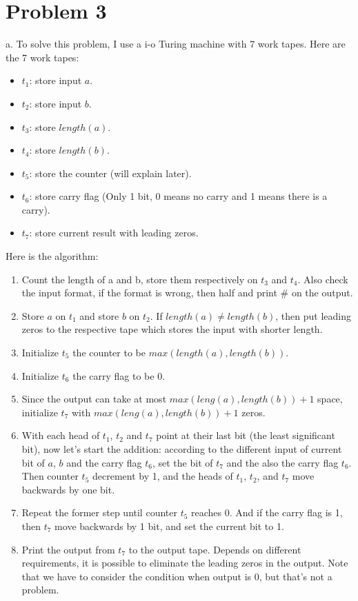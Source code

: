 \documentclass[12pt]{article}
\begin{document}
\section*{Problem 3}

a. To solve this problem, I use a i-o Turing machine with 7 work
tapes. Here are the 7 work tapes:

\begin{itemize}
\item $t_1$: store input $a$.
\item $t_2$: store input $b$.
\item $t_3$: store $length(a)$.
\item $t_4$: store $length(b)$.
\item $t_5$: store the counter (will explain later).
\item $t_6$: store carry flag (Only 1 bit, 0 means no carry and 1
  means there is a carry).
\item $t_7$: store current result with leading zeros.
\end{itemize}

Here is the algorithm:

\begin{enumerate}
\item Count the length of a and b, store them respectively on $t_3$ and
  $t_4$. Also check the input format, if the format is wrong, then half
  and print \# on the output. 
\item Store $a$ on $t_1$ and store $b$ on $t_2$. If $length(a) \neq
  length(b)$, then put leading zeros to the respective tape which
  stores the input with shorter length.
\item Initialize $t_5$ the counter to be $max(length(a), length(b))$. 
\item Initialize $t_6$ the carry flag to be $0$.
\item Since the output can take at most $max(leng(a), length(b)) + 1$
  space, initialize $t_7$ with $max(leng(a), length(b)) + 1$ zeros.
\item With each head of $t_1$, $t_2$ and $t_7$ point at their last bit
  (the least significant bit), now let's start the addition: according
  to the different input of current bit of $a$, $b$ and the carry flag
  $t_6$, set the bit of $t_7$ and the also the carry flag $t_6$. Then
  counter $t_5$ decrement by 1, and the heads of $t_1$, $t_2$, and
  $t_7$ move backwards by one bit.
\item Repeat the former step until counter $t_5$ reaches 0. And if the
  carry flag is 1, then $t_7$ move backwards by 1 bit, and set the
  current bit to 1.
\item Print the output from $t_7$ to the output tape. Depends on
  different requirements, it is possible to eliminate the leading
  zeros in the output. Note that we have to consider the condition
  when output is 0, but that's not a problem.
\end{enumerate}
\end{document}
